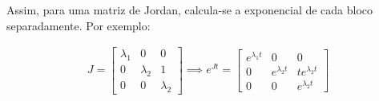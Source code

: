 \documentclass{article}
\begin{document}
Assim, para uma matriz de Jordan, calcula-se a exponencial de cada bloco separadamente. Por exemplo:

\begin{gather*}
J =
\begin{bmatrix}
\lambda_1 & 0 & 0 \\
0 & \lambda_2 & 1 \\
0 & 0 & \lambda_2
\end{bmatrix}
\implies
e^{Jt} =
\begin{bmatrix}
e^{\lambda_1 t} & 0 & 0 \\
0 & e^{\lambda_2 t} & t e^{\lambda_2 t} \\
0 & 0 & e^{\lambda_2 t}
\end{bmatrix}
\end{gather*}
\end{document}
